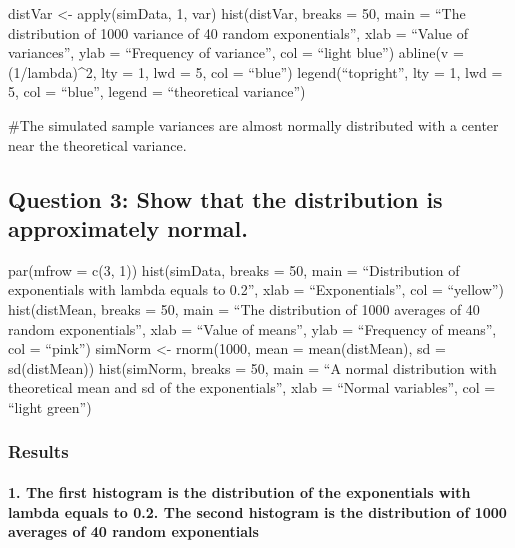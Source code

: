 \documentclass[
]{article}
\begin{document}
distVar \textless- apply(simData, 1, var) hist(distVar, breaks = 50,
main = ``The distribution of 1000 variance of 40 random exponentials'',
xlab = ``Value of variances'', ylab = ``Frequency of variance'', col =
``light blue'') abline(v = (1/lambda)\^{}2, lty = 1, lwd = 5, col =
``blue'') legend(``topright'', lty = 1, lwd = 5, col = ``blue'', legend
= ``theoretical variance'')

\#The simulated sample variances are almost normally distributed with a
center near the theoretical variance.

\hypertarget{question-3-show-that-the-distribution-is-approximately-normal.}{%
\subsection{Question 3: Show that the distribution is approximately
normal.}\label{question-3-show-that-the-distribution-is-approximately-normal.}}

par(mfrow = c(3, 1)) hist(simData, breaks = 50, main = ``Distribution of
exponentials with lambda equals to 0.2'', xlab = ``Exponentials'', col =
``yellow'') hist(distMean, breaks = 50, main = ``The distribution of
1000 averages of 40 random exponentials'', xlab = ``Value of means'',
ylab = ``Frequency of means'', col = ``pink'') simNorm \textless-
rnorm(1000, mean = mean(distMean), sd = sd(distMean)) hist(simNorm,
breaks = 50, main = ``A normal distribution with theoretical mean and sd
of the exponentials'', xlab = ``Normal variables'', col = ``light
green'')

\hypertarget{results}{%
\subsubsection{Results}\label{results}}

\hypertarget{the-first-histogram-is-the-distribution-of-the-exponentials-with-lambda-equals-to-0.2.-the-second-histogram-is-the-distribution-of-1000-averages-of-40-random-exponentials}{%
\paragraph{1. The first histogram is the distribution of the
exponentials with lambda equals to 0.2. The second histogram is the
distribution of 1000 averages of 40 random
exponentials}\label{the-first-histogram-is-the-distribution-of-the-exponentials-with-lambda-equals-to-0.2.-the-second-histogram-is-the-distribution-of-1000-averages-of-40-random-exponentials}}
\end{document}
